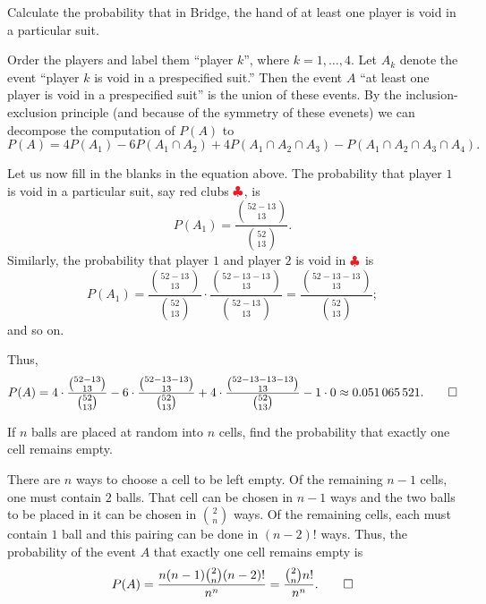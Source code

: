 \begin{problem}[Handout 2, \# 7]
  Calculate the probability that in Bridge, the hand of at least one player
  is void in a particular suit.
\end{problem}
\begin{solution*}
  Order the players and label them ``player \(k\)'', where
  \(k=1,\dotsc,4\). Let \(A_k\) denote the event ``player \(k\) is void in
  a prespecified suit.'' Then the event \(A\) ``at least one player is void
  in a prespecified suit'' is the union of these events. By the
  inclusion-exclusion principle (and because of the symmetry of these
  evenets) we can decompose the computation of \(P(A)\) to
  \[
    P(A)=4P(A_1)-6P(A_1\cap A_2)+4P(A_1\cap A_2\cap A_3)-P(A_1\cap A_2\cap
    A_3\cap A_4).
  \]

  Let us now fill in the blanks in the equation above. The probability that
  player \(1\) is void in a particular suit, say red clubs
  \(\color{Red}\clubsuit\), is
  \[
    P(A_1)=\frac{\binom{52-13}{13}}{\binom{52}{13}}.
  \]
  Similarly, the probability that player \(1\) and player \(2\) is void in
  \(\color{Red}\clubsuit\) is
  \[
    P(A_1)=\frac{\binom{52-13}{13}}{\binom{52}{13}}%
    \cdot\frac{\binom{52-13-13}{13}}%
    {\binom{52-13}{13}}%
    =\frac{\binom{52-13-13}{13}}{\binom{52}{13}};
  \]
  and so on.

  Thus,
  \[
    P(A)=4\cdot\frac{\binom{52-13}{13}}{\binom{52}{13}}
    -6\cdot\frac{\binom{52-13-13}{13}}{\binom{52}{13}}
    +4\cdot\frac{\binom{52-13-13-13}{13}}{\binom{52}{13}}
    -1\cdot0\approx \num{0.051065521}.\qedhere
  \]
\end{solution*}

\begin{problem}[Handout 2, \# 12]
  If \(n\) balls are placed at random into \(n\) cells, find the
  probability that exactly one cell remains empty.
\end{problem}
\begin{solution*}
  There are \(n\) ways to choose a cell to be left empty. Of the remaining
  \(n-1\) cells, one must contain \(2\) balls. That cell can be chosen in
  \(n-1\) ways and the two balls to be placed in it can be chosen in
  \(\binom{2}{n}\) ways. Of the remaining cells, each must contain \(1\)
  ball and this pairing can be done in \((n-2)!\) ways. Thus, the
  probability of the event \(A\) that exactly one cell remains empty is
  \[
    P(A)=\frac{n(n-1)\binom{2}{n}(n-2)!}{n^n}=\frac{\binom{2}{n}n!}{n^n}.
    \qedhere
  \]
\end{solution*}

